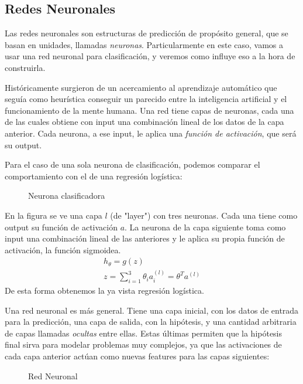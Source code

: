\subsection{Redes Neuronales}
Las redes neuronales son estructuras de predicción de propósito general, que se basan en unidades, llamadas \emph{neuronas}. Particularmente en este caso, vamos a usar una red neuronal para clasificación, y veremos como influye eso a la hora de construirla.

Históricamente %
surgieron de un acercamiento al aprendizaje automático que seguía como heurística conseguir un parecido entre la inteligencia artificial y el funcionamiento de la mente humana. Una red tiene capas de neuronas, cada una de las cuales obtiene con input una combinación lineal de los datos de la capa anterior. Cada neurona, a ese input, le aplica una \emph{función de activación}, que será su output.

Para el caso de una sola neurona de clasificación, podemos comparar el comportamiento con el de una regresión logística:

\begin{figure}[h]
\centering
\def\svgwidth{0.25\columnwidth}
\caption{Neurona clasificadora}

\end{figure}

En la figura se ve una capa $l$ (de "layer") con tres neuronas. Cada una tiene como output su función de activación $a$. La neurona de la capa siguiente toma como input una combinación lineal de las anteriores y le aplica su propia función de activación, la función sigmoidea.
\begin{eqnarray}
 h_{\theta} = g(z)  \\
 z = \sum_{i = 1}^{3}\theta_i a_i^{(l)}=\theta^T a^{(l)}
\end{eqnarray}
De esta forma obtenemos la ya vista regresión logística.

Una red neuronal es más general. Tiene una capa inicial, con los datos de entrada para la predicción, una capa de salida, con la hipótesis, y una cantidad arbitraria de capas llamadas \emph{ocultas} entre ellas. Estas últimas permiten que la hipótesis final sirva para modelar problemas muy complejos, ya que las activaciones de cada capa anterior actúan como nuevas features para las capas siguientes:

\begin{figure}[h]
\centering
\def\svgwidth{0.25\columnwidth}
\caption{Red Neuronal}

\end{figure}

